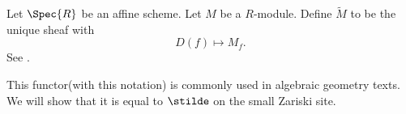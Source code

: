 \begin{definition}
Let $\Spec{R}$ be an affine scheme.
Let $M$ be a $R$-module.
Define $\widetilde{M}$ to be the unique sheaf with
\[
D(f) \mapsto M_f.
\]
See \cite[Tag 01HR]{stacks-project}.
\end{definition}

This functor(with this notation) is commonly used in algebraic geometry texts.
We will show that it is equal to $\stilde$ on the small Zariski site.